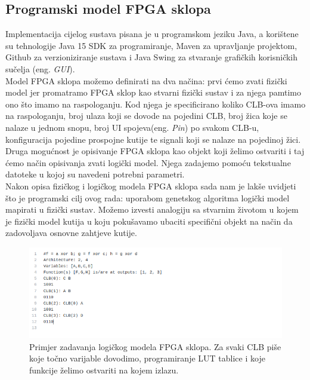 \documentclass[times, utf8, zavrsni]{fer}
\begin{document}
\subsection{Programski model FPGA sklopa}

Implementacija cijelog sustava pisana je u programskom jeziku Java, a korištene su tehnologije Java 15 SDK za programiranje, Maven za upravljanje projektom, Github za verzioniziranje sustava i Java Swing za stvaranje grafičkih korisničkih sučelja (eng. \emph{GUI}).\\ Model FPGA sklopa možemo definirati na dva načina: prvi ćemo zvati fizički model jer promatramo FPGA sklop kao stvarni fizički sustav i za njega pamtimo ono što imamo na raspologanju. Kod njega je specificirano koliko CLB-ova imamo na raspologanju, broj ulaza koji se dovode na pojedini CLB, broj žica koje se nalaze u jednom snopu, broj UI spojeva(eng. \emph{Pin}) po svakom CLB-u, konfiguracija pojedine prospojne kutije te signali koji se nalaze na pojedinoj žici.\\Druga mogućnost je opisivanje FPGA sklopa kao objekt koji želimo ostvariti i taj ćemo način opisivanja zvati logički model. Njega zadajemo pomoću tekstualne datoteke u kojoj su navedeni potrebni parametri.\\Nakon opisa fizičkog i logičkog modela FPGA sklopa sada nam je lakše uvidjeti što je programski cilj ovog rada: uporabom genetskog algoritma logički model mapirati u fizički sustav. Možemo izvesti analogiju sa stvarnim životom u kojem je fizički model kutija u koju pokušavamo ubaciti specifični objekt na način da zadovoljava osnovne zahtjeve kutije.


\begin{figure}[H]
	\centering
	\includegraphics[width=15cm]{slike/logicalModelTxt.png}
	\caption{Primjer zadavanja logičkog modela FPGA sklopa. Za svaki CLB piše koje točno varijable dovodimo, programiranje LUT tablice i koje funkcije želimo ostvariti na kojem izlazu. }
	\label{fig:fpga-logical-model}
\end{figure}
\end{document}
